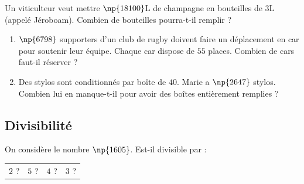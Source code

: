 \documentclass[a4paper,10pt]{report}
\begin{document}
\begin{ex}
Un viticulteur veut mettre $\np{18 100}$L de champagne en bouteilles de $3$L (appelé Jéroboam). Combien de bouteilles pourra-t-il remplir ?
\end{ex}

\begin{ex}

\medskip
\begin{enumerate}
\item $\np{6 798}$ supporters d'un club de rugby doivent faire un déplacement en car pour soutenir leur équipe. Chaque car dispose de $55$ places. Combien de cars faut-il réserver ?
\item Des stylos sont conditionnés par boîte de $40$. Marie a $\np{2 647}$ stylos. Combien lui en manque-t-il pour avoir des boîtes entièrement remplies ?
\end{enumerate} 
\end{ex}

\subsection*{Divisibilité}

\begin{ex}
On considère le nombre $\np{1605}$. Est-il divisible par :
\begin{enumerate}
\begin{tabular}{m{1.1cm}m{1.1cm}m{1.1cm}m{1.1cm}}
\item $2$ ?&
\item $5$ ?&
\item $4$ ?&
\item $3$ ?\\
\end{tabular}
\end{enumerate}
\end{ex}
\end{document}
